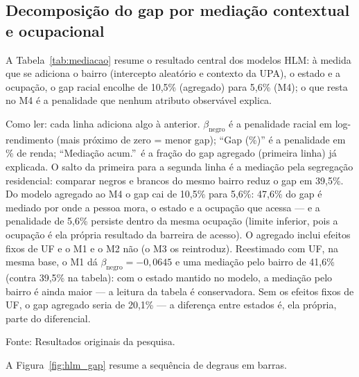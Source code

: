 \documentclass[11pt, a4paper, oneside]{article}
\begin{document}
\subsection*{Decomposição do gap por mediação contextual e ocupacional}
A Tabela~\ref{tab:mediacao} resume o resultado central dos modelos HLM: à medida
que se adiciona o bairro (intercepto aleatório e contexto da UPA), o estado e a ocupação,
o gap racial encolhe de 10,5\% (agregado) para 5,6\% (M4); o que resta
no M4 é a penalidade que nenhum atributo observável explica.
\begin{table}[!ht]
\centering
\caption{Decomposição do gap salarial racial por mediação contextual e ocupacional
(HLM de dois níveis, indivíduos em UPA, com efeitos fixos de UF; PNAD Contínua
2016--2025, população completa). Cada linha
acrescenta um bloco de controles ao anterior; à medida que se adiciona contexto e ocupação,
o gap encolhe e a mediação acumulada cresce.}
\label{tab:mediacao}
\par\smallskip
\footnotesize{Como ler:} cada linha adiciona algo à anterior. $\beta_{\text{negro}}$
é a penalidade racial em log-rendimento (mais próximo de zero = menor gap); ``Gap (\%)'' é a
penalidade em \% de renda; ``Mediação acum.''\ é a fração do gap agregado (primeira linha) já
explicada. O salto da primeira para a segunda linha é a mediação pela segregação residencial:
comparar negros e brancos {do mesmo bairro} reduz o gap em 39,5\%. Do modelo agregado
ao M4 o gap cai de 10,5\% para 5,6\%: 47,6\% do gap é mediado por
onde a pessoa mora, o estado e a ocupação que acessa --- e a penalidade de 5,6\% persiste
dentro da mesma ocupação (limite inferior, pois a ocupação é ela própria resultado da barreira de acesso). O agregado inclui efeitos fixos de UF e o M1 e o M2 não (o M3 os reintroduz). Reestimado com UF, na mesma base, o M1 dá $\beta_{\text{negro}} = −0{,}0645$ e uma mediação pelo bairro de 41,6\% (contra 39,5\% na tabela): com o estado mantido no modelo, a mediação pelo bairro é ainda maior --- a leitura da tabela é conservadora. Sem os efeitos fixos de UF, o gap agregado seria de 20,1\% --- a diferença entre estados é, ela própria, parte do diferencial.
\par\smallskip\footnotesize Fonte: Resultados originais da pesquisa.
\end{table}
 A Figura~\ref{fig:hlm_gap} resume a sequência de degraus em barras.
\end{document}
